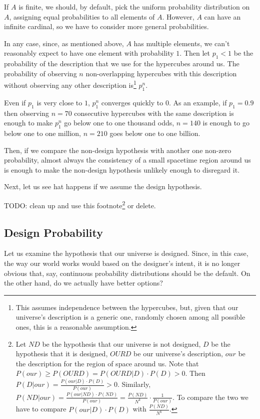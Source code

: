 \documentclass[a4paper
,draft
]{article}
\def\our_description{OURD}
\begin{document}
If $A$ is finite, we should, by default, pick the uniform probability
distribution on $A$, assigning equal probabilities to all elements of $A$.
However, $A$ can have an infinite cardinal,
so we have to consider more general probabilities.

In any case, since, as mentioned above, $A$ has multiple elements,
we can't reasonably expect to have one element with probability $1$.
Then let $p_1<1$ be the probability of the description that we use for the
hypercubes around us.
The probability of observing $n$
non-overlapping hypercubes
with this description without observing any other description is\footnote{
  This assumes independence between the hypercubes, but, given that our
  universe's description is a generic one, randomly chosen among all possible
  ones, this is a reasonable assumption.
}
$p_1^n$.

Even if $p_1$ is very close to $1$, $p_1^n$ converges quickly to 0.
As an example, if $p_1=0.9$ then observing $n=70$ consecutive hypercubes with
the same description is enough to make $p_1^n$ go below one to one thousand
odds, $n=140$ is enough to go below one to one million,
$n=210$ goes below one to one billion.

Then, if we compare the non-design hypothesis
with another one non-zero probability,
almost always the consistency of a small spacetime region around us is enough
to make the non-design hypothesis unlikely enough to disregard it.

Next, let us see hat happens if we assume the design hypothesis.

TODO: clean up and use this footnote\footnote{
  Let $ND$ be the hypothesis that our universe is not designed,
  $D$ be the hypothesis that it is designed, $\our_description$ be our
  universe's description,
  $our$ be the description for the region of space around us.
  Note that
  $P(our) \ge P(\our_description)=P(\our_description|D)\cdot P(D) > 0$.
  Then $P(D|our) = \frac{P(our|D)\cdot P(D)}{P(our)} > 0$.
  Similarly,
  $P(ND|our) = \frac{P(our|ND)\cdot P(ND)}{P(our)}
    = \frac{P(ND)}{N^k} \cdot \frac{1}{P(our)}$.
  To compare the two we have to compare
  $P(our|D)\cdot P(D)$ with $\frac{P(ND)}{N^k}$.
  } or delete.

\subsection{Design Probability}
\label{sec:design-probability}

Let us examine the hypothesis that our universe is designed.
Since, in this case, the way our world works would based
on the designer's intent,
it is no longer obvious that, say, continuous probability distributions
should be the default.
On the other hand, do we actually have better options?
\end{document}
